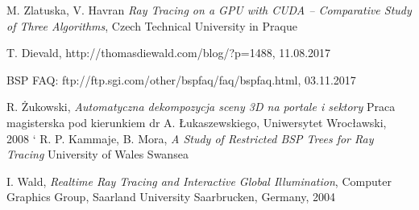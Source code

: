 \documentclass[eng,pl,printmode,openany]{mgr}
\begin{document}
\begin{thebibliography}{9}
	
	M. Zlatuska, V. Havran
	\emph{Ray Tracing on a GPU with CUDA –
Comparative Study of Three Algorithms},
	Czech Technical University in Praque
	
	T. Dievald, http://thomasdiewald.com/blog/?p=1488, 11.08.2017
	
	BSP FAQ: ftp://ftp.sgi.com/other/bspfaq/faq/bspfaq.html, 03.11.2017
	
	R. Żukowski,
	\emph{Automatyczna dekompozycja sceny 3D na portale i sektory}
	Praca magisterska pod kierunkiem dr A. Łukaszewskiego,
	Uniwersytet Wrocławski,
	2008
`	
	R. P. Kammaje, B. Mora,
	\emph{A Study of Restricted BSP Trees for Ray Tracing}
	University of Wales Swansea
	
	I. Wald,
	\emph{Realtime Ray Tracing and Interactive Global Illumination},
	Computer Graphics Group, Saarland University Saarbrucken, Germany,
	2004
	
\end{thebibliography}

\listoffigures
\end{document}
